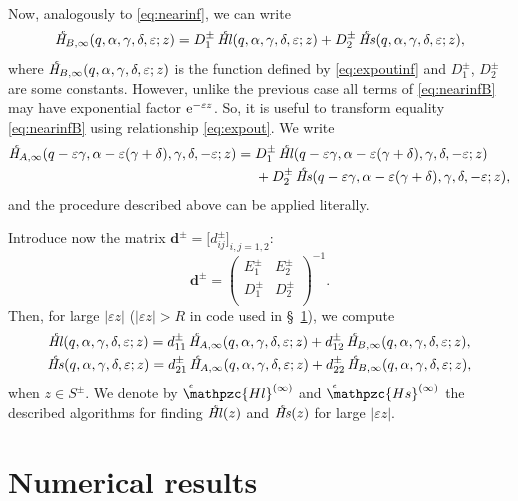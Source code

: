 \documentclass[11pt]{article}
\newcommand{\MF}[1]{\mathop{#1}\nolimits}
\newcommand{\SectInf}{S}%
\def\HeunC{\displaystyle\setbox0=\hbox{\tiny\itshape\bfseries \kern1.52mm c}\wd0=0pt\ht0=0pt\dp0=0pt\MF{\textit{\hbox{\raise1.67ex\copy0}H\/}}}%
\def\HeunCl{\setbox0=\hbox{\tiny\itshape\bfseries \kern1.52mm c}\wd0=0pt\ht0=0pt\dp0=0pt\MF{\textit{\hbox{\raise1.67ex\copy0}Hl\/}}}%
\def\HeunCs{\setbox0=\hbox{\tiny\itshape\bfseries \kern1.52mm c}\wd0=0pt\ht0=0pt\dp0=0pt\MF{\textit{\hbox{\raise1.67ex\copy0}Hs\/}}}%
\def\psHeunClnearinf{\setbox0=\hbox{\tiny\itshape\bfseries \kern1.52mm c}\wd0=0pt\ht0=0pt\dp0=0pt\MF{\hbox{\raise1.67ex\copy0}\mathpzc{Hl}^{(\infty)}}}%
\def\psHeunCsnearinf{\setbox0=\hbox{\tiny\itshape\bfseries \kern1.52mm c}\wd0=0pt\ht0=0pt\dp0=0pt\MF{\hbox{\raise1.67ex\copy0}\mathpzc{Hs}^{(\infty)}}}%
\begin{document}
Now, analogously to \eqref{eq:nearinf}, we can write 
\begin{equation}
\HeunC_{\!B,\infty}(q,\alpha,\gamma,\delta,\varepsilon;z)=
D^{\pm}_1 \HeunCl(q,\alpha,\gamma,\delta,\varepsilon;z) + 
D^{\pm}_2 \HeunCs(q,\alpha,\gamma,\delta,\varepsilon;z),
\label{eq:nearinfB}
\end{equation}
where $\HeunC_{\!B,\infty}(q,\alpha,\gamma,\delta,\varepsilon;z)$ is the function defined by \eqref{eq:expoutinf} and $D^{\pm}_1$, $D^{\pm}_2$ are some constants. However, unlike the previous case all terms of \eqref{eq:nearinfB} may have exponential factor $\textrm{e}^{-\varepsilon z}$. So, it is useful to transform equality \eqref{eq:nearinfB} using relationship \eqref{eq:expout}. We write
\begin{align*}\notag
\HeunC_{\!A,\infty}(q-\varepsilon\gamma,\alpha-\varepsilon(\gamma+\delta),\gamma,\delta,-\varepsilon;z)={}&
D^{\pm}_1 \HeunCl(q-\varepsilon\gamma,\alpha-\varepsilon(\gamma+\delta),\gamma,\delta,-\varepsilon;z) \\&{}+ 
D^{\pm}_2 \HeunCs(q-\varepsilon\gamma,\alpha-\varepsilon(\gamma+\delta),\gamma,\delta,-\varepsilon;z),
\label{eq:nearinfBmod}
\end{align*}
and the procedure described above can be applied literally.

Introduce now the matrix $\bm{d}^\pm=\bigl[d^\pm_{ij}\bigr]_{i,j=1,2}$:
\[
\bm{d}^\pm=\left(\begin{matrix}
E^\pm_1 & E^\pm_2\\
D^\pm_1 & D^\pm_2\\
\end{matrix}\right)^{-1}.
\]
Then, for large $|\varepsilon z|$ ($|\varepsilon z|>R$ in code \cite{mycode2} used in \S~\ref{sect:num}), we compute
\begin{gather*}
 \HeunCl(q,\alpha,\gamma,\delta,\varepsilon;z) = 
 d^\pm_{11}\HeunC_{\!A,\infty}(q,\alpha,\gamma,\delta,\varepsilon;z)+
 d^\pm_{12}\HeunC_{\!B,\infty}(q,\alpha,\gamma,\delta,\varepsilon;z),
 \label{eq:nearinftyl}
\\
 \HeunCs(q,\alpha,\gamma,\delta,\varepsilon;z) = 
 d^\pm_{21}\HeunC_{\!A,\infty}(q,\alpha,\gamma,\delta,\varepsilon;z)+
 d^\pm_{22}\HeunC_{\!B,\infty}(q,\alpha,\gamma,\delta,\varepsilon;z),
 \label{eq:nearinftys}
\end{gather*}
when $z\in\SectInf^\pm$. We denote by $\psHeunClnearinf$ and $\psHeunCsnearinf$ the described algorithms for finding  
$\HeunCl(z)$ and $\HeunCs(z)$ for large $|\varepsilon z|$.
 
\section{Numerical results}
\label{sect:num}
\end{document}
